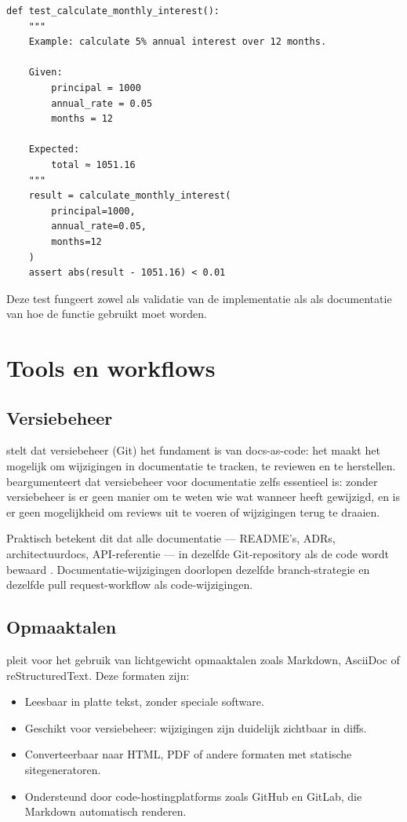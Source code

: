 \begin{verbatim}
def test_calculate_monthly_interest():
    """
    Example: calculate 5% annual interest over 12 months.

    Given:
        principal = 1000
        annual_rate = 0.05
        months = 12

    Expected:
        total ≈ 1051.16
    """
    result = calculate_monthly_interest(
        principal=1000,
        annual_rate=0.05,
        months=12
    )
    assert abs(result - 1051.16) < 0.01
\end{verbatim}

Deze test fungeert zowel als validatie van de implementatie als als documentatie van hoe de functie gebruikt moet worden.

\section{Tools en workflows}
\label{sec:cad-tools}

\subsection{Versiebeheer}
\textcite{gentle2017docslikecode} stelt dat versiebeheer (Git) het fundament is van docs-as-code: het maakt het mogelijk om wijzigingen in documentatie te tracken, te reviewen en te herstellen. \textcite{etter2016moderntechwriting} beargumenteert dat versiebeheer voor documentatie zelfs essentieel is: zonder versiebeheer is er geen manier om te weten wie wat wanneer heeft gewijzigd, en is er geen mogelijkheid om reviews uit te voeren of wijzigingen terug te draaien.

Praktisch betekent dit dat alle documentatie --- README's, ADRs, architectuurdocs, API-referentie --- in dezelfde Git-repository als de code wordt bewaard \autocite{gentle2017docslikecode}. Documentatie-wijzigingen doorlopen dezelfde branch-strategie en dezelfde pull request-workflow als code-wijzigingen.

\subsection{Opmaaktalen}
\textcite{etter2016moderntechwriting} pleit voor het gebruik van lichtgewicht opmaaktalen zoals Markdown, AsciiDoc of reStructuredText. Deze formaten zijn:
\begin{itemize}
    \item Leesbaar in platte tekst, zonder speciale software.
    \item Geschikt voor versiebeheer: wijzigingen zijn duidelijk zichtbaar in diffs.
    \item Converteerbaar naar HTML, PDF of andere formaten met statische sitegeneratoren.
    \item Ondersteund door code-hostingplatforms zoals GitHub en GitLab, die Markdown automatisch renderen.
\end{itemize}

